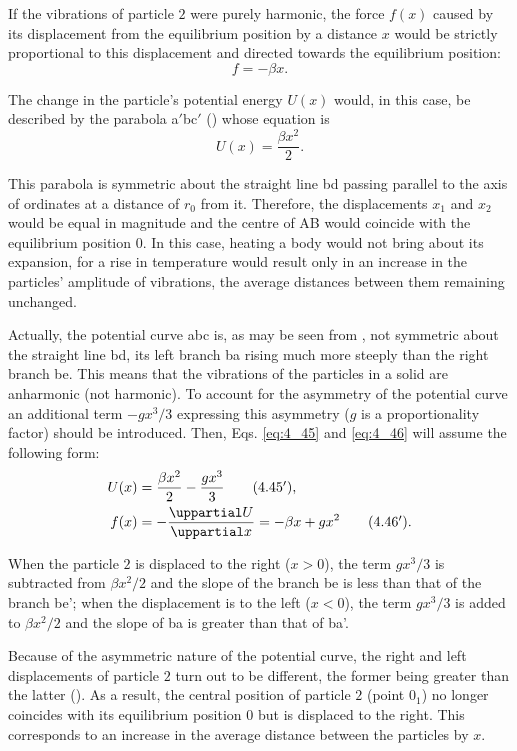 If the vibrations of particle $2$ were purely harmonic, the force $f(x)$ caused by its displacement from the equilibrium position by a distance $x$ would be strictly proportional to this displacement and directed towards the equilibrium position:
\begin{equation}\label{eq:4_45}
    f = - \beta x.
\end{equation}

The change in the particle's potential energy $U(x)$ would, in this case, be described by the parabola a$'$bc$'$ () whose equation is
\begin{equation}\label{eq:4_46}
    U(x) = \frac{\beta x^2}{2}.
\end{equation}

\noindent
This parabola is symmetric about the straight line bd passing parallel to the axis of ordinates at a distance of $r_0$ from it. Therefore, the displacements $x_1$ and $x_2$ would be equal in magnitude and the centre of AB would coincide with the equilibrium position $0$. In this case, heating a body would not bring about its expansion, for a rise in temperature would result only in an increase in the particles' amplitude of vibrations, the average distances between them remaining unchanged.

Actually, the potential curve abc is, as may be seen from , not symmetric about the straight line bd, its left branch ba rising much more steeply than the right branch be. This means that the vibrations of the particles in a solid are anharmonic (not harmonic). To account for the asymmetry of the potential curve an additional term
$-gx^3/3$ expressing this asymmetry ($g$ is a proportionality factor) should be introduced. Then, Eqs. \eqref{eq:4_45} and \eqref{eq:4_46} will assume the following form:
\begin{align}
    U(x) &= \frac{\beta x^2}{2} - \frac{g x^3}{3}\tag{4.45$'$},\label{eq:4_45p}\\
    f(x) &= -\diffpartial{U}{x} = -\beta x + g x^2\tag{4.46$'$}.\label{eq:4_46p}
\end{align}

\noindent
When the particle $2$ is displaced to the right ($x>0$), the term $gx^3/3$ is subtracted from $\beta x^2/2$ and the slope of the branch be is less than that of the branch be'; when the displacement is to the left ($x<0$), the term $gx^3/3$ is added to $\beta x^2/2$ and the slope of ba is greater than that of ba'.

Because of the asymmetric nature of the potential curve, the right and left displacements of particle $2$ turn out to be different, the former being greater than the latter (). As a result, the central position of particle $2$ (point $0_1$) no longer coincides with its equilibrium position $0$ but is displaced to the right. This corresponds to an increase in the average distance between the particles by $x$.

